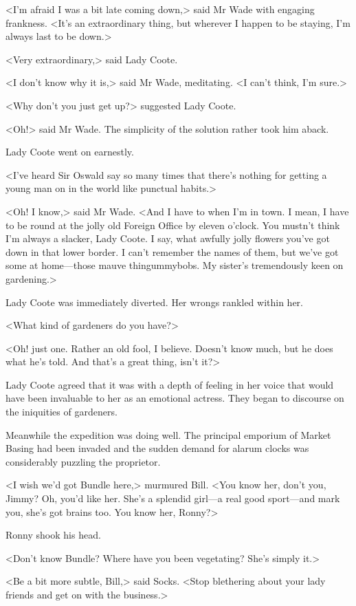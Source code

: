<I'm afraid I was a bit late coming down,> said Mr Wade with engaging frankness. <It's an extraordinary thing, but wherever I happen to be staying, I'm always last to be down.>

<Very extraordinary,> said Lady Coote.

<I don't know why it is,> said Mr Wade, meditating. <I can't think, I'm sure.>

<Why don't you just get up?> suggested Lady Coote.

<Oh!> said Mr Wade. The simplicity of the solution rather took him aback.

Lady Coote went on earnestly.

<I've heard Sir Oswald say so many times that there's nothing for getting a young man on in the world like punctual habits.>

<Oh! I know,> said Mr Wade. <And I have to when I'm in town. I mean, I have to be round at the jolly old Foreign Office by eleven o'clock. You mustn't think I'm always a slacker, Lady Coote. I say, what awfully jolly flowers you've got down in that lower border. I can't remember the names of them, but we've got some at home—those mauve thingummybobs. My sister's tremendously keen on gardening.>

Lady Coote was immediately diverted. Her wrongs rankled within her.

<What kind of gardeners do you have?>

<Oh! just one. Rather an old fool, I believe. Doesn't know much, but he does what he's told. And that's a great thing, isn't it?>

Lady Coote agreed that it was with a depth of feeling in her voice that would have been invaluable to her as an emotional actress. They began to discourse on the iniquities of gardeners.

Meanwhile the expedition was doing well. The principal emporium of Market Basing had been invaded and the sudden demand for alarum clocks was considerably puzzling the proprietor.

<I wish we'd got Bundle here,> murmured Bill. <You know her, don't you, Jimmy? Oh, you'd like her. She's a splendid girl—a real good sport—and mark you, she's got brains too. You know her, Ronny?>

Ronny shook his head.

<Don't know Bundle? Where have you been vegetating? She's simply it.>

<Be a bit more subtle, Bill,> said Socks. <Stop blethering about your lady friends and get on with the business.>

